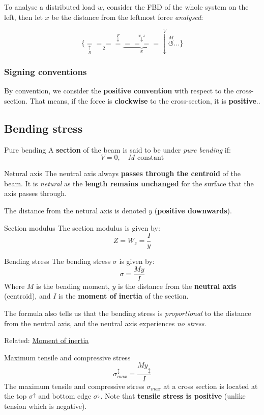 \vspace{1cm}
To analyse a distributed load $w$, consider the FBD of the whole system on the left, then let $x$ be the distance from the leftmost force \emph{analysed}:

\large
\[\{\underset{\underset{R}{\uparrow}}{=}\underset{2}{==}\overset{\overset{F}{\downarrow}}{=}\underbrace{\overset{\overset{w\cdot x}{\downarrow}}{====}}_x\overset{V}{\downarrow}\overset{M}{\circlearrowleft}\dots\}\]

\subsubsection{Signing conventions}
By convention, we consider the \textbf{positive convention} with respect to the cross-section. That means, if the force is \textbf{clockwise} to the cross-section, it is \textbf{positive}..

\label{sec:bendingstress}
\subsection{Bending stress}
\begin{definition}
    {Pure bending}
    A \textbf{section} of the beam is said to be under \emph{pure bending} if:
    \[V=0,\quad M\text{ constant}\]
\end{definition}
\begin{knBox}
    {Netural axis}
    The neutral axis always \textbf{passes through the centroid} of the beam. It is \emph{netural} as the \textbf{length remains unchanged} for the surface that the axis passes through.

    The distance from the netural axis is denoted $y$ (\textbf{positive downwards}).
\end{knBox}
\begin{knBox}
    {Section modulus}
    The section modulus is given by:
    \[Z=W_z=\frac{I}{y}\]
\end{knBox}
\begin{theorem}
    {Bending stress}
    The bending stress $\sigma$ is given by:
    \[\sigma=\frac{My}{I}\]
    Where $M$ is the bending moment, $y$ is the distance from the \textbf{neutral axis} (centroid), and $I$ is the \textbf{moment of inertia} of the section.

    The formula also tells us that the bending stress is \emph{proportional} to the distance from the neutral axis, and the neutral axis experiences \emph{no stress}.

    Related: \hyperref[sec:momentinertia]{Moment of inertia}
\end{theorem}
\begin{theorem}
    {Maximum tensile and compressive stress}
    \[\sigma^\updownarrow_{max}=\frac{My_\updownarrow}{I}\]
    The maximum tensile and compressive stress $\sigma_{max}$ at a cross section is located at the top $\sigma^\uparrow$  and bottom edge $\sigma^\downarrow$. Note that \textbf{tensile stress is positive} (unlike tension which is negative).
\end{theorem}
